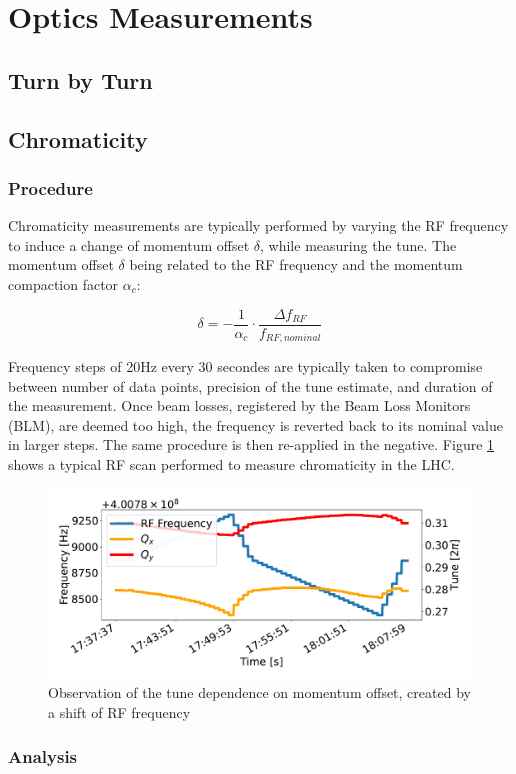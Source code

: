 \section{Optics Measurements}



\subsection{Turn by Turn}





\subsection{Chromaticity}

\subsubsection{Procedure}

Chromaticity measurements are typically performed by varying the RF frequency to induce a change of momentum offset $\delta$, while measuring the tune.
The momentum offset $\delta$ being related to the RF frequency and the momentum compaction factor $\alpha_c$:

\begin{equation}
    \delta = - \frac{1}{\alpha_c} \cdot \frac{\Delta f_{RF}}{f_{RF,nominal}}
    \label{eq:dpp_rf}
\end{equation}

Frequency steps of 20Hz every 30 secondes are typically taken to compromise between number of data points, precision of the tune estimate, and duration of the measurement.
Once beam losses, registered by the Beam Loss Monitors (BLM), are deemed too high, the frequency is reverted back to its nominal value in larger steps. The same procedure is then re-applied in the negative. Figure \ref{fig:measurements:rf_scan} shows a typical RF scan performed to measure chromaticity in the LHC.

\begin{figure}[H]
    \centering
    \includegraphics[width=1\textwidth]{images/rf_scan.pdf}
    \caption{Observation of the tune dependence on momentum offset, created by a shift of RF frequency}
    \label{fig:measurements:rf_scan}
\end{figure}




\subsubsection{Analysis}

